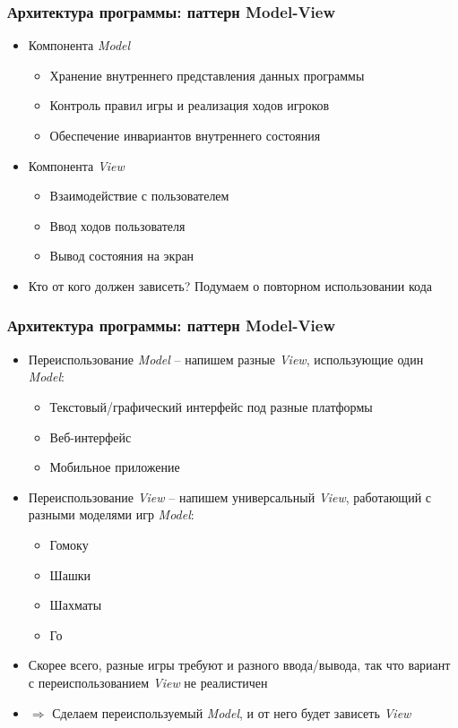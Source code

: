 \documentclass[10pt]{beamer}
\begin{document}
\begin{frame}[fragile]
\frametitle{Архитектура программы: паттерн Model-View}
\begin{itemize}
\item Компонента \textit{Model}
\begin{itemize}
\item Хранение внутреннего представления данных программы
\item Контроль правил игры и реализация ходов игроков
\item Обеспечение инвариантов внутреннего состояния
\end{itemize}
\pause
\item Компонента \textit{View}
\begin{itemize}
\item Взаимодействие с пользователем
\item Ввод ходов пользователя
\item Вывод состояния на экран
\end{itemize}
\pause
\item Кто от кого должен зависеть? \pause Подумаем о повторном использовании кода
\end{itemize}
\end{frame}

\begin{frame}[fragile]
\frametitle{Архитектура программы: паттерн Model-View}
\begin{itemize}
\item Переиспользование \textit{Model} -- напишем разные \textit{View}, использующие один \textit{Model}:
\begin{itemize}
\item Текстовый/графический интерфейс под разные платформы
\item Веб-интерфейс
\item Мобильное приложение
\end{itemize}
\pause
\item Переиспользование \textit{View} -- напишем универсальный \textit{View}, работающий с разными моделями игр \textit{Model}:
\begin{itemize}
\item Гомоку
\item Шашки
\item Шахматы
\item Го
\end{itemize}
\pause
\item Скорее всего, разные игры требуют и разного ввода/вывода, так что вариант с переиспользованием \textit{View} не реалистичен
\pause
\item \(\Longrightarrow\) Сделаем переиспользуемый \textit{Model}, и от него будет зависеть \textit{View}
\end{itemize}
\end{frame}
\end{document}
